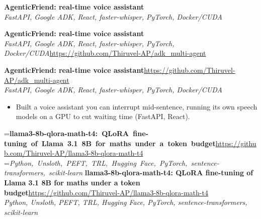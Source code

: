 \documentclass[a4paper,11pt]{article}
\newcommand{\project}[3]{%
  \textbf{#1}\hfill#3\\ {\color{muted}\small\textit{#2}}\par}
\newcommand{\gap}{\vspace{5pt}}
\begin{document}
\textbf{AgenticFriend: real-time voice assistant}\\ {\color{muted}\small\textit{FastAPI, Google ADK, React, faster-whisper, PyTorch, Docker/CUDA}}\\ \par
\else
\textbf{AgenticFriend: real-time voice assistant}\\ {\color{muted}\small\textit{FastAPI, Google ADK, React, faster-whisper, PyTorch, Docker/CUDA}}\hfill{\small\url{https://github.com/Thiruvel-AP/adk_multi-agent}}\par
\fi
\else
\project{AgenticFriend: real-time voice assistant}{FastAPI, Google ADK, React, faster-whisper, PyTorch, Docker/CUDA}{\url{https://github.com/Thiruvel-AP/adk_multi-agent}}
\fi
\begin{itemize}
  \item Built a voice assistant you can interrupt mid-sentence, running its own speech models on a GPU to cut waiting time (FastAPI, React).
\end{itemize}
\gap
{}
=\hbox{\textbf{llama3-8b-qlora-math-t4: QLoRA fine-tuning of Llama 3.1 8B for maths under a token budget}\hspace{1em}\url{https://github.com/Thiruvel-AP/llama3-8b-qlora-math-t4}}%
=\hbox{{\small\textit{Python, Unsloth, PEFT, TRL, Hugging Face, PyTorch, sentence-transformers, scikit-learn}}}%
\ifdim\wd0>\linewidth
\ifdim\wd2>\linewidth
\textbf{llama3-8b-qlora-math-t4: QLoRA fine-tuning of Llama 3.1 8B for maths under a token budget}\\ {\color{muted}\small\textit{Python, Unsloth, PEFT, TRL, Hugging Face, PyTorch, sentence-transformers, scikit-learn}}\\ \hspace*{\fill}{\small\url{https://github.com/Thiruvel-AP/llama3-8b-qlora-math-t4}}\par
\else
\textbf{llama3-8b-qlora-math-t4: QLoRA fine-tuning of Llama 3.1 8B for maths under a token budget}\\ {\color{muted}\small\textit{Python, Unsloth, PEFT, TRL, Hugging Face, PyTorch, sentence-transformers, scikit-learn}}\hfill{\small\url{https://github.com/Thiruvel-AP/llama3-8b-qlora-math-t4}}\par
\fi
\else
\project{llama3-8b-qlora-math-t4: QLoRA fine-tuning of Llama 3.1 8B for maths under a token budget}{Python, Unsloth, PEFT, TRL, Hugging Face, PyTorch, sentence-transformers, scikit-learn}{\url{https://github.com/Thiruvel-AP/llama3-8b-qlora-math-t4}}
\end{document}
